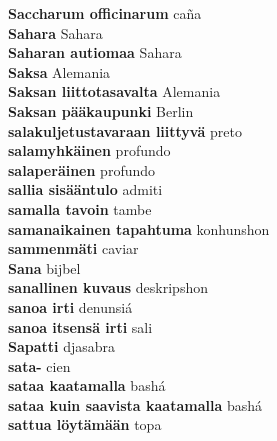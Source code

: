 \textbf{ Saccharum officinarum  } caña \\
\textbf{ Sahara  } Sahara \\
\textbf{ Saharan autiomaa  } Sahara \\
\textbf{ Saksa  } Alemania \\
\textbf{ Saksan liittotasavalta  } Alemania \\
\textbf{ Saksan pääkaupunki  } Berlin \\
\textbf{ salakuljetustavaraan liittyvä  } preto \\
\textbf{ salamyhkäinen  } profundo \\
\textbf{ salaperäinen  } profundo \\
\textbf{ sallia sisääntulo  } admiti \\
\textbf{ samalla tavoin  } tambe \\
\textbf{ samanaikainen tapahtuma  } konhunshon \\
\textbf{ sammenmäti  } caviar \\
\textbf{ Sana  } bijbel \\
\textbf{ sanallinen kuvaus  } deskripshon \\
\textbf{ sanoa irti  } denunsiá \\
\textbf{ sanoa itsensä irti  } sali \\
\textbf{ Sapatti  } djasabra \\
\textbf{ sata-  } cien \\
\textbf{ sataa kaatamalla  } bashá \\
\textbf{ sataa kuin saavista kaatamalla  } bashá \\
\textbf{ sattua löytämään  } topa \\
